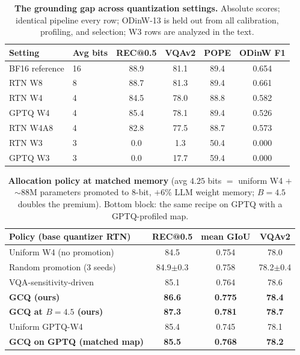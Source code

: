 \documentclass{article}
\begin{document}
\begin{table}[t]
  \centering
  \caption{\textbf{The grounding gap across quantization settings.} Absolute scores; identical pipeline every row; ODinW-13 is held out from all calibration, profiling, and selection; W3 rows are analyzed in the text.}
  \label{tab:gap}
  \small
  \begin{tabular}{llcccc}
    \toprule
    Setting & Avg bits & REC@0.5 & VQAv2 & POPE & ODinW F1 \\
    \midrule
    BF16 reference & 16 & 88.9 & 81.1 & 89.4 & 0.654 \\
    RTN W8 & 8 & 88.7 & 81.3 & 89.4 & 0.661 \\
    \midrule
    RTN W4 & 4 & 84.5 & 78.0 & 88.8 & 0.582 \\
    GPTQ W4 & 4 & 85.4 & 78.1 & 89.4 & 0.526 \\
    RTN W4A8 & 4 & 82.8 & 77.5 & 88.7 & 0.573 \\
    \midrule
    RTN W3 & 3 & 0.0 & 1.3 & 50.4 & 0.000 \\
    GPTQ W3 & 3 & 0.0 & 17.7 & 59.4 & 0.000 \\
    \bottomrule
  \end{tabular}
\end{table}

\begin{table}[t]
  \centering
  \caption{\textbf{Allocation policy at matched memory} (avg $4.25$ bits $=$ uniform W4 $+$ ${\sim}88$M parameters promoted to 8-bit, $+6$\% LLM weight memory; $B{=}4.5$ doubles the premium). Bottom block: the same recipe on GPTQ with a GPTQ-profiled map.}
  \label{tab:alloc}
  \small
  \begin{tabular}{lccc}
    \toprule
    Policy (base quantizer RTN) & REC@0.5 & mean GIoU & VQAv2 \\
    \midrule
    Uniform W4 (no promotion) & 84.5 & 0.754 & 78.0 \\
    Random promotion (3 seeds) & 84.9$\pm$0.3 & 0.758 & 78.2$\pm$0.4 \\
    VQA-sensitivity-driven & 85.1 & 0.764 & 78.6 \\
    \textbf{GCQ (ours)} & \textbf{86.6} & \textbf{0.775} & \textbf{78.4} \\
    \textbf{GCQ at $B{=}4.5$ (ours)} & \textbf{87.3} & \textbf{0.781} & \textbf{78.7} \\
    \midrule
    Uniform GPTQ-W4 & 85.4 & 0.745 & 78.1 \\
    \textbf{GCQ on GPTQ (matched map)} & \textbf{85.5} & \textbf{0.768} & \textbf{78.2} \\
    \bottomrule
  \end{tabular}
\end{table}
\end{document}

